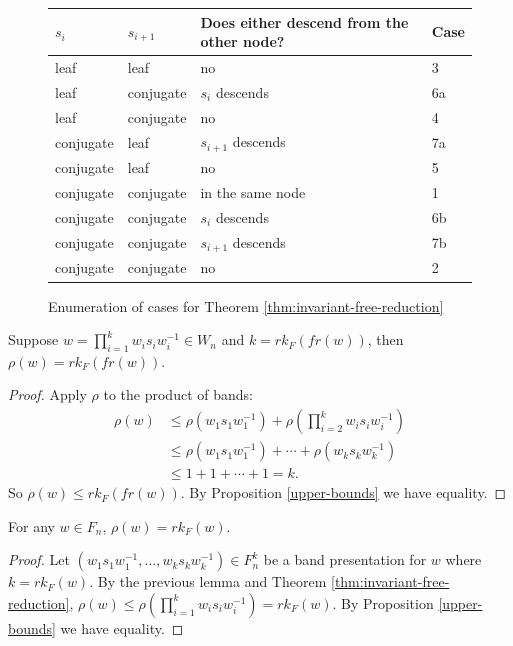 \documentclass[12pt]{thesis}
\begin{document}
\begin{figure}[h]
    \centering
\begin{tabular}{ l l l | l}
    $s_{i}$ & $s_{i+1}$ & Does either descend from the other node? & Case \\
    \hline
    leaf & leaf & no & 3 \\
    leaf & conjugate & $s_{i}$ descends & 6a \\
    leaf & conjugate & no &  4 \\
    conjugate & leaf & $s_{i+1}$ descends &  7a \\
    conjugate & leaf & no &  5 \\
    conjugate & conjugate & in the same node & 1 \\
    conjugate & conjugate & $s_{i}$ descends & 6b \\
    conjugate & conjugate & $s_{i+1}$ descends & 7b \\
    conjugate & conjugate & no & 2\\
\end{tabular}
    \caption{Enumeration of cases for Theorem \ref{thm:invariant-free-reduction}}
    \label{fig:case-analysis}
\end{figure}


\begin{lemma}
    Suppose $w = \prod_{i=1}^{k} w_{i}s_{i}w_{i}^{-1} \in W_{n}$
    and $k = rk_{F}(fr(w))$,
    then $\rho(w) = rk_{F}(fr(w))$.
\end{lemma}

\begin{proof}
   Apply $\rho$ to the product of bands:
\[
\begin{split}
    \rho(w) &\leq \rho(w_{1}s_{1}w_{1}^{-1}) + \rho(\prod_{i=2}^{k} w_{i}s_{i}w_{i}^{-1}) \\
    &\leq \rho(w_{1}s_{1}w_{1}^{-1}) + \cdots + \rho(w_{k}s_{k}w_{k}^{-1}) \\
    &\leq 1 + 1 + \cdots + 1 = k.
\end{split}
\]
    So $\rho(w) \leq rk_{F}(fr(w))$.
    By Proposition \ref{upper-bounds} we have equality.
\end{proof}

\begin{corollary}
    For any $w \in F_{n}$,
    $\rho(w) = rk_{F}(w)$. 
\end{corollary}

\begin{proof}
    Let $(w_{1}s_{1}w_{1}^{-1}, \ldots, w_{k}s_{k}w_{k}^{-1}) \in F_{n}^{k}$
    be a band presentation for $w$ where $k = rk_{F}(w)$.
    By the previous lemma and Theorem \ref{thm:invariant-free-reduction},
    $\rho(w) \leq \rho(\prod_{i=1}^{k} w_{i}s_{i}w_{i}^{-1}) = rk_{F}(w)$.
    By Proposition \ref{upper-bounds} we have equality.
\end{proof}
\end{document}
